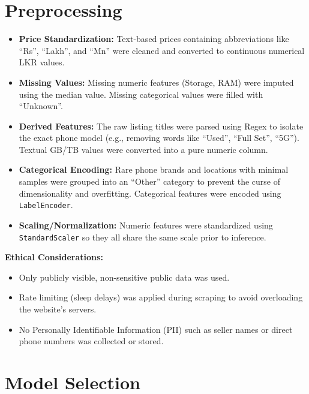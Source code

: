 \documentclass[12pt,a4paper]{article}
\begin{document}
\section{Preprocessing}
\begin{itemize}
    \item \textbf{Price Standardization:} Text-based prices containing abbreviations like ``Rs'', ``Lakh'', and ``Mn'' were cleaned and converted to continuous numerical LKR values. 
    \item \textbf{Missing Values:} Missing numeric features (Storage, RAM) were imputed using the median value. Missing categorical values were filled with ``Unknown''. 
    \item \textbf{Derived Features:} The raw listing titles were parsed using Regex to isolate the exact phone model (e.g., removing words like ``Used'', ``Full Set'', ``5G''). Textual GB/TB values were converted into a pure numeric column. 
    \item \textbf{Categorical Encoding:} Rare phone brands and locations with minimal samples were grouped into an ``Other'' category to prevent the curse of dimensionality and overfitting. Categorical features were encoded using \texttt{LabelEncoder}. 
    \item \textbf{Scaling/Normalization:} Numeric features were standardized using \texttt{StandardScaler} so they all share the same scale prior to inference. 
\end{itemize}

\textbf{Ethical Considerations:}
\begin{itemize}
    \item Only publicly visible, non-sensitive public data was used. 
    \item Rate limiting (sleep delays) was applied during scraping to avoid overloading the website’s servers. 
    \item No Personally Identifiable Information (PII) such as seller names or direct phone numbers was collected or stored.
\end{itemize}

\section{Model Selection}
\end{document}
